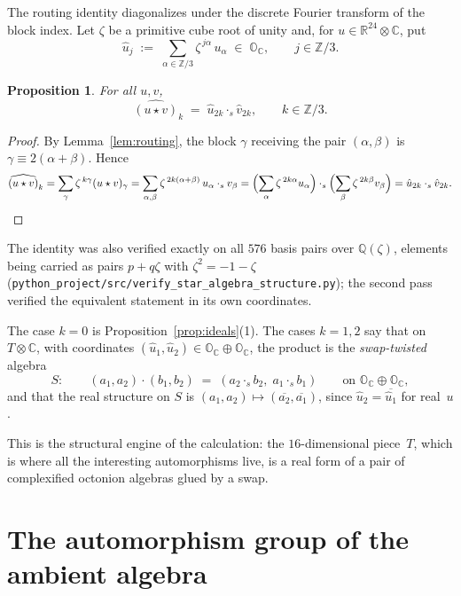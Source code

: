 \documentclass[11pt]{amsart}
\newcommand{\OO}{\mathbb{O}}
\newcommand{\ZZ}{\mathbb{Z}}
\newcommand{\QQ}{\mathbb{Q}}
\newcommand{\RR}{\mathbb{R}}
\newcommand{\CC}{\mathbb{C}}
\newtheorem{proposition}[theorem]{Proposition}
\theoremstyle{definition}
\theoremstyle{remark}
\begin{document}
The routing identity diagonalizes under the discrete Fourier transform of
the block index. Let $\zeta$ be a primitive cube root of unity and, for
$u \in \RR^{24} \otimes \CC$, put
\[
  \hat u_j \;:=\; \sum_{\alpha \in \ZZ/3} \zeta^{\,j\alpha}\, u_\alpha
  \;\in\; \OO_\CC, \qquad j \in \ZZ/3 .
\]

\begin{proposition}\label{prop:fourier}
For all $u, v$,
\[
  \widehat{(u \star v)}_k \;=\; \hat u_{2k} \cdot_s \hat v_{2k},
  \qquad k \in \ZZ/3 .
\]
\end{proposition}

\begin{proof}
By Lemma~\ref{lem:routing}, the block $\gamma$ receiving the pair
$(\alpha,\beta)$ is $\gamma \equiv 2(\alpha+\beta)$. Hence
\[
  \widehat{(u \star v)}_k
  = \sum_{\gamma} \zeta^{\,k\gamma} (u \star v)_\gamma
  = \sum_{\alpha, \beta} \zeta^{\,2k(\alpha+\beta)}\, u_\alpha \cdot_s v_\beta
  = \Bigl(\sum_\alpha \zeta^{\,2k\alpha} u_\alpha\Bigr) \cdot_s
    \Bigl(\sum_\beta \zeta^{\,2k\beta} v_\beta\Bigr)
  = \hat u_{2k} \cdot_s \hat v_{2k}. \qedhere
\]
\end{proof}

The identity was also verified exactly on all $576$ basis pairs over
$\QQ(\zeta)$, elements being carried as pairs $p + q\zeta$ with
$\zeta^2 = -1 - \zeta$
(\texttt{python\_project/src/verify\_star\_algebra\_structure.py}); the
second pass verified the equivalent statement in its own coordinates.

The case $k = 0$ is Proposition~\ref{prop:ideals}(1). The cases $k = 1, 2$
say that on $T \otimes \CC$, with coordinates $(\hat u_1, \hat u_2) \in
\OO_\CC \oplus \OO_\CC$, the product is the \emph{swap-twisted} algebra
\begin{equation}\label{eq:swap}
  S : \qquad (a_1, a_2) \cdot (b_1, b_2) \;=\;
    (a_2 \cdot_s b_2,\; a_1 \cdot_s b_1)
  \qquad \text{on } \OO_\CC \oplus \OO_\CC ,
\end{equation}
and that the real structure on $S$ is
$(a_1, a_2) \mapsto (\overline{a_2}, \overline{a_1})$, since
$\hat u_2 = \overline{\hat u_1}$ for real~$u$.

This is the structural engine of the calculation: the $16$-dimensional
piece~$T$, which is where all the interesting automorphisms live, is a real
form of a pair of complexified octonion algebras glued by a swap.

\section{The automorphism group of the ambient algebra}\label{sec:ambient}
\end{document}
